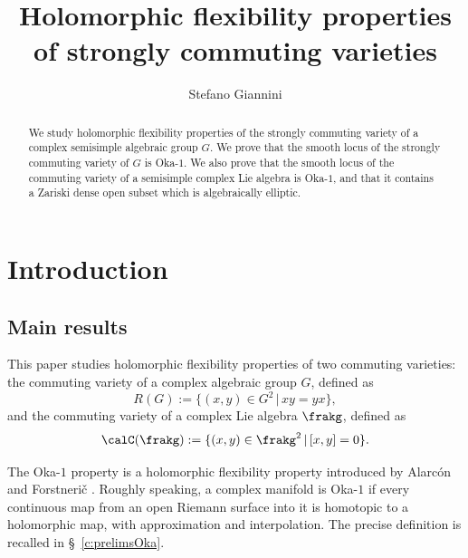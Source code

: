 \documentclass[12pt, a4paper, oneside]{amsart}
\title[Holomorphic flexibility properties of strongly commuting varieties]{Holomorphic flexibility properties\\ of strongly commuting varieties}
\author{Stefano Giannini}
\theoremstyle{plain} %
\theoremstyle{definition} %
\theoremstyle{remark} %
\begin{document}
\begin{abstract}
We study holomorphic flexibility properties of the strongly commuting variety of a complex semisimple algebraic group $G$. We prove that the smooth locus of the strongly commuting variety of $G$ is Oka-$1$. We also prove that the smooth locus of the commuting variety of a semisimple complex Lie algebra is Oka-$1$, and that it contains a Zariski dense open subset which is algebraically elliptic.
\end{abstract}

\maketitle


\tableofcontents

\section{Introduction}


\makeatletter
\begingroup
\let\@tocwrite\@gobbletwo


\subsection*{Main results}
This paper studies holomorphic flexibility properties of two commuting varieties: the commuting variety of a complex algebraic group $G$, defined as
\[R(G) := \{(x,y)\in G^2\,|\,xy=yx\},\]
and the commuting variety of a complex Lie algebra $\frakg$, defined as
\[\calC(\frakg):=\{(x,y)\in \frakg^2\,|\, [x,y]=0\}.\]

The Oka-$1$ property is a holomorphic flexibility property introduced by Alarc\'on and Forstneri\v c \cite{AF25}. Roughly speaking, a complex manifold is Oka-$1$ if every continuous map from an open Riemann surface into it is homotopic to a holomorphic map, with approximation and interpolation. The precise definition is recalled in \S~\ref{c:prelimsOka}.
\end{document}
